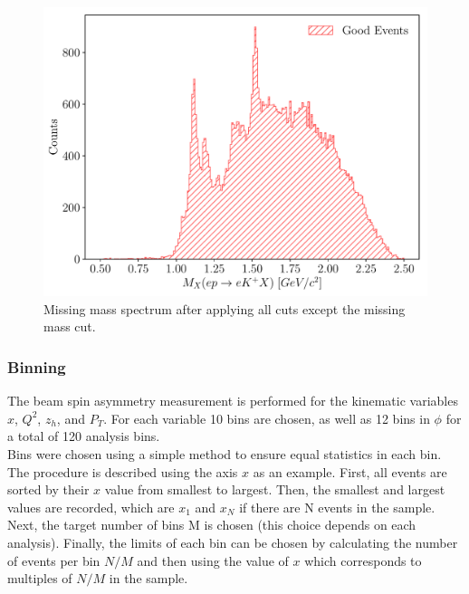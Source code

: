 
\begin{figure}
	\centering
	\includegraphics[width=16cm]{image/plots/kaon-bsa/mx.pdf}
	\caption{Missing mass spectrum after applying all cuts except the missing mass cut.}
\end{figure}

\subsubsection*{Binning}

The beam spin asymmetry measurement is performed for the kinematic variables $x$, $Q^2$, $z_h$, and $P_T$.  For each variable 10 bins are chosen, as well as 12 bins in $\phi$ for a total of 120 analysis bins. \\

Bins were chosen using a simple method to ensure equal statistics in each bin.  The procedure is described using the axis $x$ as an example.  First, all events are sorted by their $x$ value from smallest to largest.  Then, the smallest and largest values are recorded, which are $x_1$ and $x_N$ if there are N events in the sample.  Next, the target number of bins M is chosen (this choice depends on each analysis).  Finally, the limits of each bin can be chosen by calculating the number of events per bin $N/M$ and then using the value of $x$ which corresponds to multiples of $N/M$ in the sample.    

